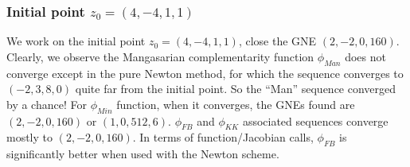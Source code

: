 \documentclass[11pt, a4paper]{article}
\newcommand{\code}{\texttt}
\begin{document}
%
%


\subsubsection{Initial point $z_0 = (4, -4,  1,  1)$}

We work on the initial point $z_0 = (4, -4,  1,  1)$, close the GNE  $(2, -2, 0, 160)$.
Clearly, we observe the Mangasarian complementarity function $\phi_{Man}$ does not converge except in the pure Newton method, for which the sequence converges to $(-2, 3, 8, 0)$ quite far from the initial point. So the ``Man'' sequence converged by a chance! For $\phi_{Min}$ function, when it converges, the GNEs found are $(2, -2, 0, 160)$ or $(1, 0, 512, 6)$. $\phi_{FB}$ and $\phi_{KK}$ associated sequences converge mostly to  $(2, -2, 0, 160)$. In terms of function/Jacobian calls, $\phi_{FB}$ is significantly better when used with the Newton scheme. 
\end{document}
